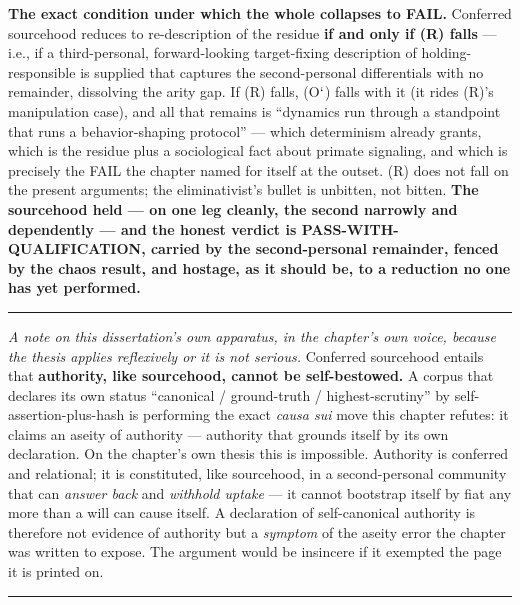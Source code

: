 \documentclass[11pt]{article}
\begin{document}
\textbf{The exact condition under which the whole collapses to FAIL.} Conferred sourcehood reduces to re-description of the residue \textbf{if and only if (R) falls} — i.e., if a third-personal, forward-looking target-fixing description of holding-responsible is supplied that captures the second-personal differentials with no remainder, dissolving the arity gap. If (R) falls, (O\ensuremath{`}) falls with it (it rides (R)'s manipulation case), and all that remains is ``dynamics run through a standpoint that runs a behavior-shaping protocol'' — which determinism already grants, which is the residue plus a sociological fact about primate signaling, and which is precisely the FAIL the chapter named for itself at the outset. (R) does not fall on the present arguments; the eliminativist's bullet is unbitten, not bitten. \textbf{The sourcehood held — on one leg cleanly, the second narrowly and dependently — and the honest verdict is PASS-WITH-QUALIFICATION, carried by the second-personal remainder, fenced by the chaos result, and hostage, as it should be, to a reduction no one has yet performed.}

\medskip\noindent\rule{\linewidth}{0.3pt}\medskip

\emph{A note on this dissertation's own apparatus, in the chapter's own voice, because the thesis applies reflexively or it is not serious.} Conferred sourcehood entails that \textbf{authority, like sourcehood, cannot be self-bestowed.} A corpus that declares its own status ``canonical /\allowbreak{} ground-truth /\allowbreak{} highest-scrutiny'' by self-assertion-plus-hash is performing the exact \emph{causa sui} move this chapter refutes: it claims an aseity of authority — authority that grounds itself by its own declaration. On the chapter's own thesis this is impossible. Authority is conferred and relational; it is constituted, like sourcehood, in a second-personal community that can \emph{answer back} and \emph{withhold uptake} — it cannot bootstrap itself by fiat any more than a will can cause itself. A declaration of self-canonical authority is therefore not evidence of authority but a \emph{symptom} of the aseity error the chapter was written to expose. The argument would be insincere if it exempted the page it is printed on.

\medskip\noindent\rule{\linewidth}{0.3pt}\medskip
\end{document}
